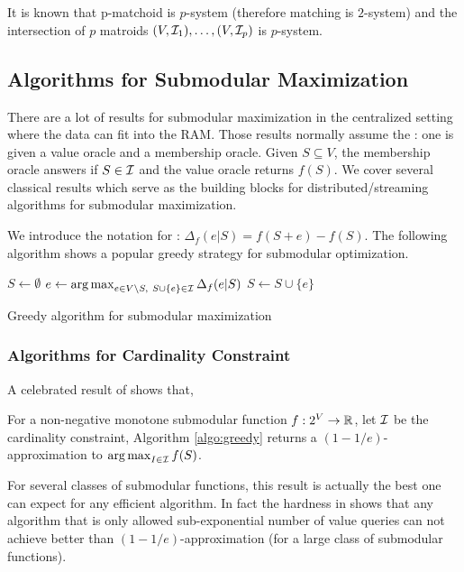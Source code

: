 It is known that p-matchoid is $p$-system (therefore matching is $2$-system) and the intersection of $p$ matroids $(V, \mathcal{I}_1), \ldots, (V, \mathcal{I}_p)$ is $p$-system. 





\subsection{Algorithms for Submodular Maximization}
There are a lot of results for submodular maximization in the centralized setting where the data can fit into the RAM. Those results normally assume the : one is given a value oracle and a membership oracle. Given $S\subseteq V$, the membership oracle answers if $S \in \mathcal{I}$ and the value oracle returns $f(S)$. We cover several classical results which serve as the building blocks for distributed/streaming algorithms for submodular maximization.

We introduce the notation for : $\Delta_f(e|S) = f(S + e) - f(S)$. The following algorithm shows a popular greedy strategy for submodular optimization.

\begin{algorithm}[H]
\DontPrintSemicolon %
$S \gets \emptyset$\;
 {
  $e \gets \operatorname*{arg\,max}_{e\in V\backslash S, ~S\cup\{e\}\in \mathcal{I}} \Delta_f(e|S)$\;\label{line:emax}
  $S \gets S\cup \{e\}$\;
}
\;
\caption{{\sc Greedy} algorithm for submodular maximization}
\label{algo:greedy}
\end{algorithm}


\subsubsection{Algorithms for Cardinality Constraint}


A celebrated result of \cite{NWF78} shows that,
\begin{theorem}
  \label{thm:1978}
  For a non-negative monotone submodular function $f: 2^V \rightarrow \mathbb{R}$, let $\mathcal{I}$ be the cardinality constraint, Algorithm \ref{algo:greedy} returns a $(1 - 1/e)$-approximation to $\operatorname*{arg\,max}_{I\in \mathcal{I}} f(S)$.
\end{theorem}
For several classes of submodular functions, this result is actually the best one can expect for any efficient algorithm. In fact the hardness in \cite{NWF78,F98} shows that any algorithm that is only allowed sub-exponential number of value queries can not achieve better than $(1 - 1/e)$-approximation (for a large class of submodular functions).


